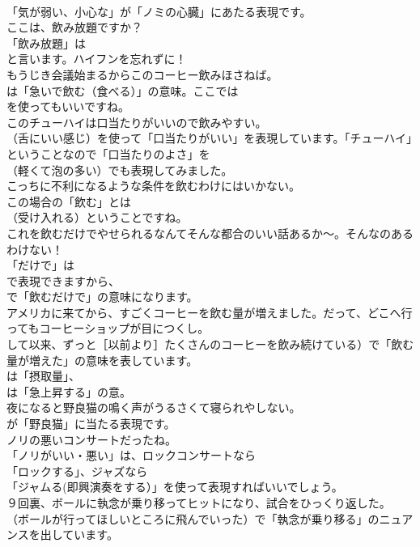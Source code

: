 \documentclass[8pt]{extreport}
\begin{document}
\begin{CJK}{UTF8}{min}
\\	「気が弱い、小心な」が「ノミの心臓」にあたる表現です。	
\\	ここは、飲み放題ですか？ 
\\	「飲み放題」は
\\	と言います。ハイフンを忘れずに！	
\\	もうじき会議始まるからこのコーヒー飲みほさねば。 
\\	は「急いで飲む（食べる）」の意味。ここでは
\\	を使ってもいいですね。	
\\	このチューハイは口当たりがいいので飲みやすい。 
\\	（舌にいい感じ）を使って「口当たりがいい」を表現しています。「チューハイ」ということなので「口当たりのよさ」を 
\\	（軽くて泡の多い）でも表現してみました。	
\\	こっちに不利になるような条件を飲むわけにはいかない。 
\\	この場合の「飲む」とは
\\	（受け入れる）ということですね。	
\\	これを飲むだけでやせられるなんてそんな都合のいい話あるか～。そんなのあるわけない！ 
\\	「だけで」は
\\	で表現できますから、
\\	で「飲むだけで」の意味になります。	
\\	アメリカに来てから、すごくコーヒーを飲む量が増えました。だって、どこへ行ってもコーヒーショップが目につくし。 
\\	して以来、ずっと［以前より］たくさんのコーヒーを飲み続けている）で「飲む量が増えた」の意味を表しています。
\\	は「摂取量」、
\\	は「急上昇する」の意。	
\\	夜になると野良猫の鳴く声がうるさくて寝られやしない。 
\\	が「野良猫」に当たる表現です。	
\\	ノリの悪いコンサートだったね。 
\\	「ノリがいい・悪い」は、ロックコンサートなら
\\	「ロックする」、ジャズなら
\\	「ジャムる(即興演奏をする）」を使って表現すればいいでしょう。	
\\	９回裏、ボールに執念が乗り移ってヒットになり、試合をひっくり返した。 
\\	（ボールが行ってほしいところに飛んでいった）で「執念が乗り移る」のニュアンスを出しています。	

\end{CJK}
\end{document}
